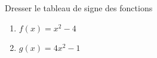 
\begin{exercice}\label{exosmath-0201}

    Dresser le tableau de signe des fonctions
    \begin{enumerate}
        \item
            \( f(x)=x^2-4\)
        \item
            \( g(x)=4x^2-1\)
    \end{enumerate}

\end{exercice}
